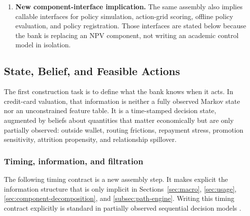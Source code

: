 \documentclass[11pt]{article}
\newcommand{\1}{\mathbf{1}}
\begin{document}
\begin{enumerate}[label=\arabic*.]
        the observation equations, the Bayesian filtering recursion, and the
        constrained belief-state Bellman recursion are new derivations in this
        proposal. They are introduced because the earlier sections name the
        ingredients of a dynamic system, while this chapter assembles them into
        a full state-space model.
  \item \textbf{New component-interface implication.} The same assembly also
        implies callable interfaces for policy simulation, action-grid scoring,
        offline policy evaluation, and policy registration. Those interfaces are
        stated below because the bank is replacing an NPV component, not writing
        an academic control model in isolation.
\end{enumerate}

\subsection{State, Belief, and Feasible Actions}

The first construction task is to define what the bank knows when it acts. In
credit-card valuation, that information is neither a fully observed Markov
state nor an unconstrained feature table. It is a time-stamped decision state,
augmented by beliefs about quantities that matter economically but are only
partially observed: outside wallet, routing frictions, repayment stress,
promotion sensitivity, attrition propensity, and relationship spillover.

\subsubsection{Timing, information, and filtration}
\label{subsec:state-space-timing}

The following timing contract is a new assembly step. It makes explicit the
information structure that is only implicit in Sections~\ref{sec:macro},
\ref{sec:usage}, \ref{sec:component-decomposition}, and
\ref{subsec:path-engine}. Writing this timing contract explicitly is standard
in partially observed sequential decision models
\citep{smallwood1973pomdp,kaelbling1998pomdp}.
\end{document}
